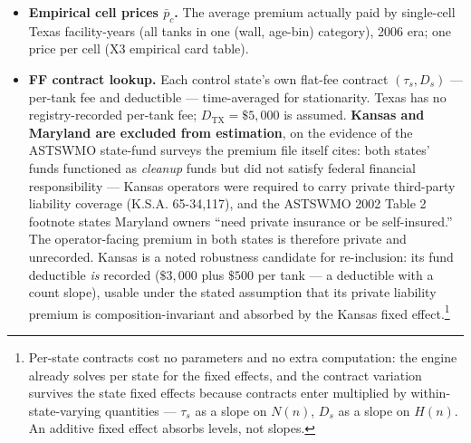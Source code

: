 \documentclass[
  letterpaper,
  DIV=11,
  numbers=noendperiod]{scrartcl}
\begin{document}
\begin{itemize}
\item
  \textbf{Empirical cell prices \(\bar p_c\).} The average premium
  actually paid by single-cell Texas facility-years (all tanks in one
  (wall, age-bin) category), 2006 era; one price per cell (X3 empirical
  card table).
\item
  \textbf{FF contract lookup.} Each control state's own flat-fee
  contract \((\tau_s, D_s)\) --- per-tank fee and deductible ---
  time-averaged for stationarity. Texas has no registry-recorded
  per-tank fee; \(D_{\text{TX}} = \$5{,}000\) is assumed. \textbf{Kansas
  and Maryland are excluded from estimation}, on the evidence of the
  ASTSWMO state-fund surveys the premium file itself cites: both states'
  funds functioned as \emph{cleanup} funds but did not satisfy federal
  financial responsibility --- Kansas operators were required to carry
  private third-party liability coverage (K.S.A. 65-34,117), and the
  ASTSWMO 2002 Table 2 footnote states Maryland owners ``need private
  insurance or be self-insured.'' The operator-facing premium in both
  states is therefore private and unrecorded. Kansas is a noted
  robustness candidate for re-inclusion: its fund deductible \emph{is}
  recorded (\(\$3{,}000\) plus \(\$500\) per tank --- a deductible with
  a count slope), usable under the stated assumption that its private
  liability premium is composition-invariant and absorbed by the Kansas
  fixed effect.\footnote{Per-state contracts cost no parameters and no
    extra computation: the engine already solves per state for the fixed
    effects, and the contract variation survives the state fixed effects
    because contracts enter multiplied by within-state-varying
    quantities --- \(\tau_s\) as a slope on \(N(n)\), \(D_s\) as a slope
    on \(H(n)\). An additive fixed effect absorbs levels, not slopes.}


\end{itemize}
\end{document}
